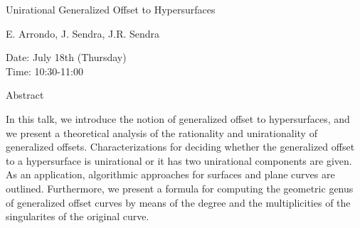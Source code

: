 \begin{center}
\LARGE
Unirational Generalized Offset to Hypersurfaces

\end{center}

\begin{center}
\Large
E. Arrondo, J. Sendra, J.R. Sendra

\end{center}

\noindent
Date:  July 18th (Thursday) \\
Time: 10:30-11:00\\

\begin{center}
\large
Abstract
\end{center}

 In this talk, we introduce the notion of generalized offset to hypersurfaces, and we
    present a theoretical analysis of the rationality and unirationality of generalized offsets.
    Characterizations for deciding whether the generalized offset to a hypersurface is unirational
    or it has two unirational components are given. As an application, algorithmic approaches
    for surfaces and plane curves are outlined. Furthermore, we present a formula for computing
    the geometric genus of generalized offset curves by means of the degree and the
    multiplicities of the singularites of the original curve. 

